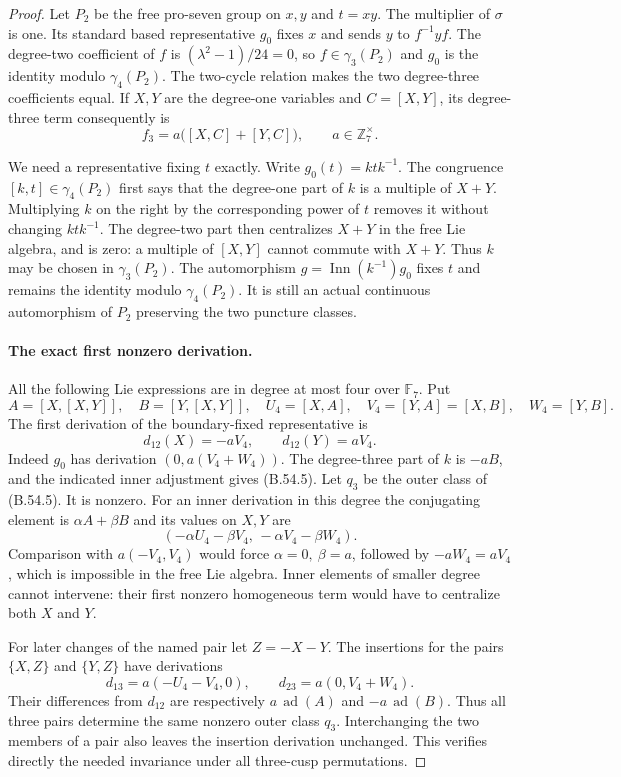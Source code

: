\begin{proof}
Let $P_2$ be the free pro-seven group on $x,y$ and
$t=xy$. The multiplier of $\sigma$ is one. Its standard
based representative $g_0$ fixes $x$ and sends
$y$ to $f^{-1}yf$. The degree-two coefficient of $f$ is
$(\lambda^2-1)/24=0$, so $f\in\gamma_3(P_2)$ and
$g_0$ is the identity modulo $\gamma_4(P_2)$.
The two-cycle relation makes the two degree-three
coefficients equal. If $X,Y$ are the degree-one variables
and $C=[X,Y]$, its degree-three term consequently is
\[
                  f_3=a\bigl([X,C]+[Y,C]\bigr),
                          \qquad a\in\mathbb Z_7^\times.  \tag{B.54.4}
\]

We need a representative fixing $t$ exactly. Write
$g_0(t)=ktk^{-1}$. The congruence $[k,t]\in\gamma_4(P_2)$
first says that the degree-one part of $k$ is a multiple
of $X+Y$. Multiplying $k$ on the right by the corresponding
power of $t$ removes it without changing $ktk^{-1}$.
The degree-two part then centralizes $X+Y$ in the free
Lie algebra, and is zero: a multiple of $[X,Y]$ cannot
commute with $X+Y$. Thus $k$ may be chosen in
$\gamma_3(P_2)$. The automorphism
$g=\operatorname{Inn}(k^{-1})g_0$ fixes $t$ and remains
the identity modulo $\gamma_4(P_2)$. It is still an actual
continuous automorphism of $P_2$ preserving the two
puncture classes.

\paragraph{The exact first nonzero derivation.}
All the following Lie expressions are in degree at most
four over $\mathbb F_7$. Put
\[
 A=[X,[X,Y]],\quad B=[Y,[X,Y]],\quad
 U_4=[X,A],\quad V_4=[Y,A]=[X,B],\quad W_4=[Y,B].
\]
The first derivation of the boundary-fixed representative
is
\[
               d_{12}(X)=-aV_4,\qquad
               d_{12}(Y)=aV_4.                            \tag{B.54.5}
\]
Indeed $g_0$ has derivation $(0,a(V_4+W_4))$.
The degree-three part of $k$ is $-aB$, and the indicated
inner adjustment gives (B.54.5).
Let $q_3$ be the outer class of (B.54.5).
It is nonzero. For an inner derivation in this degree the
conjugating element is $\alpha A+\beta B$ and its values
on $X,Y$ are
\[
           (-\alpha U_4-\beta V_4,\,
                            -\alpha V_4-\beta W_4).
\]
Comparison with $a(-V_4,V_4)$ would force
$\alpha=0,\ \beta=a$, followed by
$-aW_4=aV_4$, which is impossible in the free Lie algebra.
Inner elements of smaller degree cannot intervene: their
first nonzero homogeneous term would have to centralize
both $X$ and $Y$.

For later changes of the named pair let $Z=-X-Y$.
The insertions for the pairs $\{X,Z\}$ and $\{Y,Z\}$
have derivations
\[
 d_{13}=a(-U_4-V_4,0),\qquad
 d_{23}=a(0,V_4+W_4).
\]
Their differences from $d_{12}$ are respectively
$a\,\operatorname{ad}(A)$ and
$-a\,\operatorname{ad}(B)$. Thus all three pairs determine
the same nonzero outer class $q_3$. Interchanging the two
members of a pair also leaves the insertion derivation
unchanged. This verifies directly the needed invariance
under all three-cusp permutations.


\end{proof}
